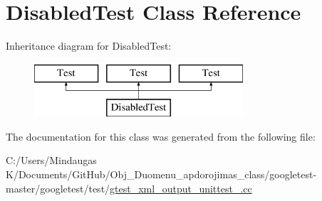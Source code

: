 \hypertarget{class_disabled_test}{}\section{Disabled\+Test Class Reference}
\label{class_disabled_test}
Inheritance diagram for Disabled\+Test\+:\begin{figure}[H]
\begin{center}
\leavevmode
\includegraphics[height=2.000000cm]{d4/dc6/class_disabled_test}
\end{center}
\end{figure}


The documentation for this class was generated from the following file\+:\begin{DoxyCompactItemize}
\item 
C\+:/\+Users/\+Mindaugas K/\+Documents/\+Git\+Hub/\+Obj\+\_\+\+Duomenu\+\_\+apdorojimas\+\_\+class/googletest-\/master/googletest/test/\mbox{\hyperlink{googletest-master_2googletest_2test_2gtest__xml__output__unittest___8cc}{gtest\+\_\+xml\+\_\+output\+\_\+unittest\+\_\+.\+cc}}\end{DoxyCompactItemize}
